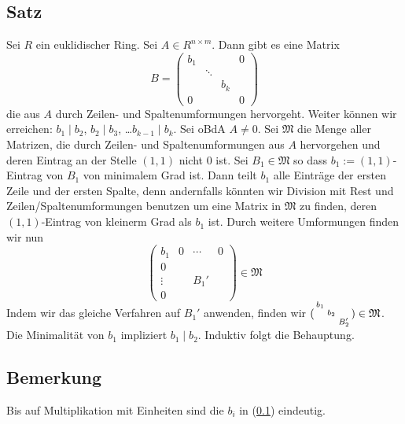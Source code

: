 \subsection[Satz: Erzeugen einer Diagonalmatrix im Fall euklidischer Ringe]{Satz} %
\label{sub:1423}
Sei $R$ ein euklidischer Ring. Sei $A \in R^{n \times m}$. Dann gibt es eine Matrix
\[
	B= \begin{pmatrix}
		b_1 & & & 0 \\
		 & \ddots & & \\
		 & & b_k & \\
		 0 & & & 0
	\end{pmatrix}
\] die aus $A$ durch Zeilen- und Spaltenumformungen hervorgeht. Weiter können wir erreichen: $b_1 \mid b_2$, $ b_2 \mid b_3$, \ldots $ b_{k-1} \mid b_k$. 
Sei oBdA $A \not= 0$. Sei $\mathfrak{M}$ die Menge aller Matrizen, die durch Zeilen- und Spaltenumformungen aus $A$ hervorgehen und deren Eintrag an der Stelle $(1,1)$
nicht $0$ ist. Sei $B_1 \in \mathfrak{M}$ so dass $b_1 := (1,1)$-Eintrag von $B_1$ von minimalem Grad ist. Dann teilt $b_1$ alle Einträge der ersten Zeile und der ersten 
Spalte, denn andernfalls könnten wir Division mit Rest und Zeilen/Spaltenumformungen benutzen um eine Matrix in $\mathfrak{M}$ zu finden, deren $(1,1)$-Eintrag von
kleinerm Grad als $b_1$ ist. Durch weitere Umformungen finden wir nun 
\[
	\begin{pmatrix}
		b_1 & 0 & \cdots & 0 \\
		0  & & & \\
		\vdots & & B_1' & \\
		0 & & & 
	\end{pmatrix} \in \mathfrak{M}
\]
Indem wir das gleiche Verfahren auf $B_1'$ anwenden, finden wir $(\begin{smallmatrix} b_1 & & \\ & b_2 & \\ & & B_2' \end{smallmatrix})  \in \mathfrak{M}$.
Die Minimalität von $b_1$ impliziert $b_1 \mid b_2$. Induktiv folgt die Behauptung. \bewende

\subsection{Bemerkung} %
\label{sub:1424}
Bis auf Multiplikation mit Einheiten sind die $b_i$ in (\ref{sub:1423}) eindeutig.

